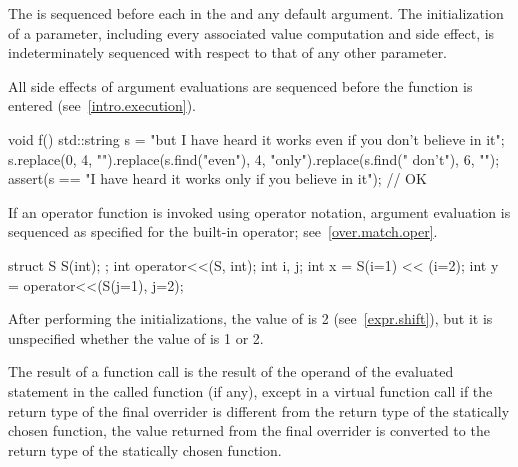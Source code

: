 \pnum
{}%
%
%
The  is sequenced before
each  in the 
and any default argument.
The initialization of a parameter,
including every associated value computation and side effect,
is indeterminately sequenced with respect to that of any other parameter.
\begin{note}
All side effects of
argument evaluations are sequenced before the function is
entered (see~\ref{intro.execution}).
\end{note}
\begin{example}
\begin{codeblock}
void f() {
  std::string s = "but I have heard it works even if you don't believe in it";
  s.replace(0, 4, "").replace(s.find("even"), 4, "only").replace(s.find(" don't"), 6, "");
  assert(s == "I have heard it works only if you believe in it"); // OK
}
\end{codeblock}
\end{example}
\begin{note}
If an operator function is invoked
using operator notation,
argument evaluation is sequenced
as specified for the built-in operator;
see~\ref{over.match.oper}.
\end{note}
\begin{example}
\begin{codeblock}
struct S {
  S(int);
};
int operator<<(S, int);
int i, j;
int x = S(i=1) << (i=2);
int y = operator<<(S(j=1), j=2);
\end{codeblock}
After performing the initializations,
the value of  is 2 (see~\ref{expr.shift}),
but it is unspecified whether the value of  is 1 or 2.
\end{example}

\pnum
The result of a function call is the
result of the operand of the evaluated  statement
in the called function (if any),
except in a virtual function call if the return type of the
final overrider is different from the return type of the statically
chosen function, the value returned from the final overrider is
converted to the return type of the statically chosen function.


